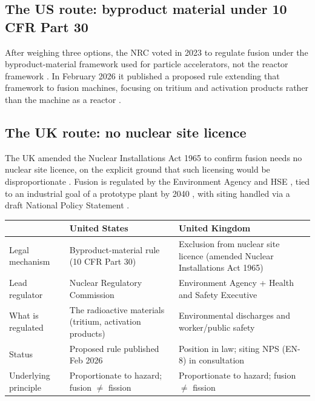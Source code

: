 \documentclass[11pt,a4paper]{article}
\begin{document}
\subsection{The US route: byproduct material under 10 CFR Part 30}
After weighing three options, the NRC voted in 2023 to regulate fusion under the
byproduct-material framework used for particle accelerators, not the reactor
framework \citep{nrc2023vote,nrc2023frnotice,cfr10part30}. In February 2026 it
published a proposed rule extending that framework to fusion machines, focusing
on tritium and activation products rather than the machine as a reactor
\citep{nrc2026proposedrule,orrick2026}.

\subsection{The UK route: no nuclear site licence}
The UK amended the Nuclear Installations Act 1965 to confirm fusion needs no
nuclear site licence, on the explicit ground that such licensing would be
disproportionate \citep{ukfusionregfactsheet}. Fusion is regulated by the
Environment Agency and HSE \citep{ukenvagency2022}, tied to an industrial goal of
a prototype plant by 2040 \citep{uktowardsfusion2023}, with siting handled via a
draft National Policy Statement \citep{uken8nps2026}.

\begin{center}
\small
\begin{tabularx}{\linewidth}{@{}lXX@{}}
\toprule
 & \textbf{United States} & \textbf{United Kingdom} \\
\midrule
Legal mechanism & Byproduct-material rule (10 CFR Part 30) & Exclusion from nuclear site licence (amended Nuclear Installations Act 1965) \\
Lead regulator & Nuclear Regulatory Commission & Environment Agency + Health and Safety Executive \\
What is regulated & The radioactive materials (tritium, activation products) & Environmental discharges and worker/public safety \\
Status & Proposed rule published Feb 2026 & Position in law; siting NPS (EN-8) in consultation \\
Underlying principle & Proportionate to hazard; fusion $\neq$ fission & Proportionate to hazard; fusion $\neq$ fission \\
\bottomrule
\end{tabularx}
\end{center}
\end{document}
